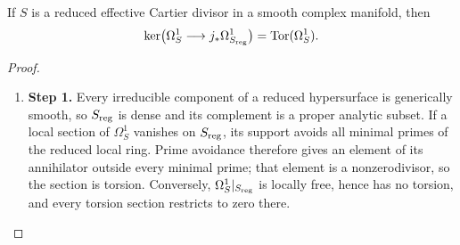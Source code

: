 \begin{lemma}
\hypertarget{tag-03IF}{}\label{wbII:lem:torsion-identification}

If $S$ is a reduced effective Cartier divisor in a smooth complex manifold,
then
\[
\ker\bigl(\Omega^1_S\longrightarrow j_*\Omega^1_{S_{\rm reg}}\bigr)
  =\operatorname{Tor}(\Omega^1_S).
\]
\end{lemma}



\begin{proof}
\begin{enumerate}[label={$\langle1\rangle$\arabic*.},leftmargin=*]
\item 
\noindent\textbf{Step 1.} Every irreducible component of a reduced hypersurface is generically smooth,
so $S_{\rm reg}$ is dense and its complement is a proper analytic subset.
If a local section of $\Omega^1_S$ vanishes on $S_{\rm reg}$, its support avoids
all minimal primes of the reduced local ring.  Prime avoidance therefore gives
an element of its annihilator outside every minimal prime; that element is a
nonzerodivisor, so the section is torsion.  Conversely,
$\Omega^1_S|_{S_{\rm reg}}$ is locally free, hence has no torsion, and every
torsion section restricts to zero there.

\end{enumerate}
\end{proof}